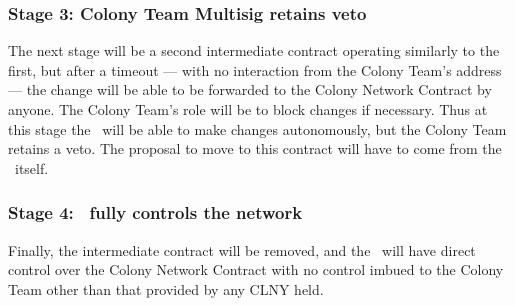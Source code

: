 \subsubsection*{Stage 3: Colony Team Multisig retains veto}
The next stage will be a second intermediate contract operating similarly to the first, but after a timeout --- with no interaction from the Colony Team's address --- the change will be able to be forwarded to the Colony Network Contract by anyone. The Colony Team's role will be to block changes if necessary. Thus at this stage the \rc\ will be able to make changes autonomously, but the Colony Team retains a veto.  The proposal to move to this contract will have to come from the \rc\ itself. 

\subsubsection*{Stage 4: \rc\ fully controls the network}
Finally, the intermediate contract will be removed, and the \rc\ will have direct control over the Colony Network Contract with no control imbued to the Colony Team other than that provided by any CLNY held. 

